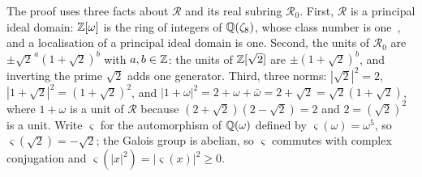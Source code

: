 \documentclass[acmsmall,screen,review,anonymous,nonacm]{acmart}
\begin{document}
The proof uses three facts about $\mathcal R$ and its real subring
$\mathcal R_0$. First,
$\mathcal R$ is a principal ideal domain: $\mathbb{Z}[\omega]$ is the ring of integers
of $\mathbb{Q}(\zeta_8)$, whose class number is
one~\cite[Ch.~11]{Washington1997Cyclotomic}, and a localisation of a principal
ideal domain is one. Second, the units of $\mathcal R_0$ are
$\pm\sqrt2^{\,a}(1+\sqrt2)^{b}$ with $a, b \in \mathbb{Z}$: the units of $\mathbb{Z}[\sqrt2]$
are $\pm(1+\sqrt2)^{b}$, and inverting the prime $\sqrt2$ adds one generator.
Third, three norms: $|\sqrt2|^{2} = 2$, $|1+\sqrt2|^{2} = (1+\sqrt2)^{2}$, and
$|1+\omega|^{2} = 2 + \omega + \bar\omega = 2+\sqrt2 = \sqrt2(1+\sqrt2)$,
where $1+\omega$ is a unit of $\mathcal R$ because $(2+\sqrt2)(2-\sqrt2) = 2$
and $2 = (\sqrt2)^{2}$ is a unit. Write $\varsigma$ for the automorphism of
$\mathbb{Q}(\omega)$ defined by $\varsigma(\omega)=\omega^5$, so
$\varsigma(\sqrt2) = -\sqrt2$; the Galois group is abelian,
so $\varsigma$ commutes with complex conjugation and $\varsigma(|x|^{2}) =
|\varsigma(x)|^{2} \ge 0$.
\end{document}
